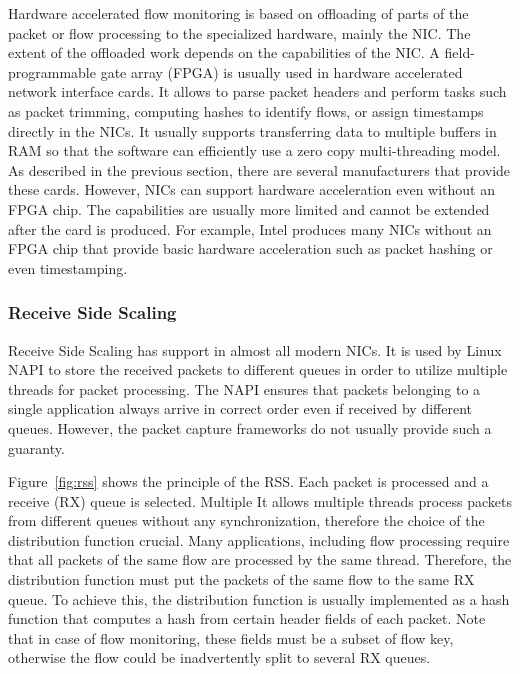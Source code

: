 Hardware accelerated flow monitoring is based on offloading of parts of the packet or flow processing to the specialized hardware, mainly the NIC. The extent of the offloaded work depends on the capabilities of the NIC. A field-programmable gate array (FPGA) is usually used in hardware accelerated network interface cards. It allows to parse packet headers and perform tasks such as packet trimming, computing hashes to identify flows, or assign timestamps directly in the NICs. It usually supports transferring data to multiple buffers in RAM so that the software can efficiently use a zero copy multi-threading model. As described in the previous section, there are several manufacturers that provide these cards. However, NICs can support hardware acceleration even without an FPGA chip. The capabilities are usually more limited and cannot be extended after the card is produced. For example, Intel produces many NICs without an FPGA chip that provide basic hardware acceleration such as packet hashing or even timestamping.

\subsubsection{Receive Side Scaling}
Receive Side Scaling has support in almost all modern NICs. It is used by Linux NAPI to store the received packets to different queues in order to utilize multiple threads for packet processing. The NAPI ensures that packets belonging to a single application always arrive in correct order even if received by different queues. However, the packet capture frameworks do not usually provide such a guaranty.

Figure~\ref{fig:rss} shows the principle of the RSS. Each packet is processed and a receive (RX) queue is selected. Multiple It allows multiple threads process packets from different queues without any synchronization, therefore the choice of the distribution function crucial. Many applications, including flow processing require that all packets of the same flow are processed by the same thread. Therefore, the distribution function must put the packets of the same flow to the same RX queue. To achieve this, the distribution function is usually implemented as a hash function that computes a hash from certain header fields of each packet. Note that in case of flow monitoring, these fields must be a subset of flow key, otherwise the flow could be inadvertently split to several RX queues. 

